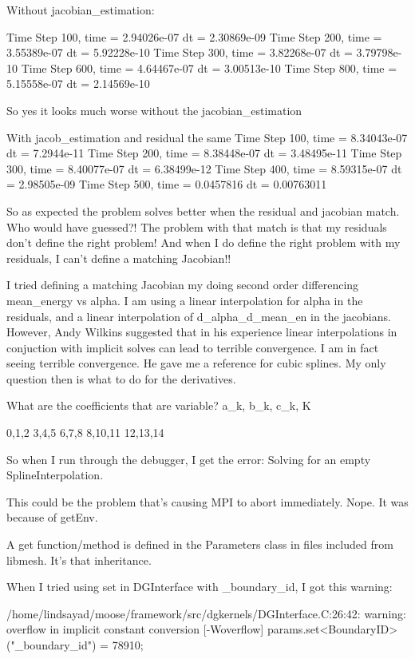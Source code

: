 {Without jacobian_estimation:

Time Step 100, time = 2.94026e-07
                dt = 2.30869e-09
Time Step 200, time = 3.55389e-07
                dt = 5.92228e-10
Time Step 300, time = 3.82268e-07
                dt = 3.79798e-10
Time Step 600, time = 4.64467e-07
                dt = 3.00513e-10
Time Step 800, time = 5.15558e-07
                dt = 2.14569e-10

So yes it looks much worse without the jacobian_estimation

With jacob_estimation and residual the same
Time Step 100, time = 8.34043e-07
                dt = 7.2944e-11
Time Step 200, time = 8.38448e-07
                dt = 3.48495e-11
Time Step 300, time = 8.40077e-07
                dt = 6.38499e-12
Time Step 400, time = 8.59315e-07
                dt = 2.98505e-09
Time Step 500, time = 0.0457816
                dt = 0.00763011

So as expected the problem solves better when the residual and jacobian match. Who would have guessed?! The problem with that match is that my residuals don't define the right problem! And when I do define the right problem with my residuals, I can't define a matching Jacobian!!

I tried defining a matching Jacobian my doing second order differencing mean_energy vs alpha. I am using a linear interpolation for alpha in the residuals, and a linear interpolation of d_alpha_d_mean_en in the jacobians. However, Andy Wilkins suggested that in his experience linear interpolations in conjuction with implicit solves can lead to terrible convergence. I am in fact seeing terrible convergence. He gave me a reference for cubic splines. My only question then is what to do for the derivatives.

What are the coefficients that are variable? a_k, b_k, c_k, K

0,1,2 3,4,5 6,7,8 8,10,11
12,13,14

So when I run through the debugger, I get the error: Solving for an empty SplineInterpolation.

This could be the problem that's causing MPI to abort immediately. Nope. It was because of getEnv.

A get function/method is defined in the Parameters class in files included from libmesh. It's that inheritance.

When I tried using set in DGInterface with _boundary_id, I got this warning:

/home/lindsayad/moose/framework/src/dgkernels/DGInterface.C:26:42: warning: overflow in implicit constant conversion [-Woverflow]
   params.set<BoundaryID>("_boundary_id") = 78910;

}
